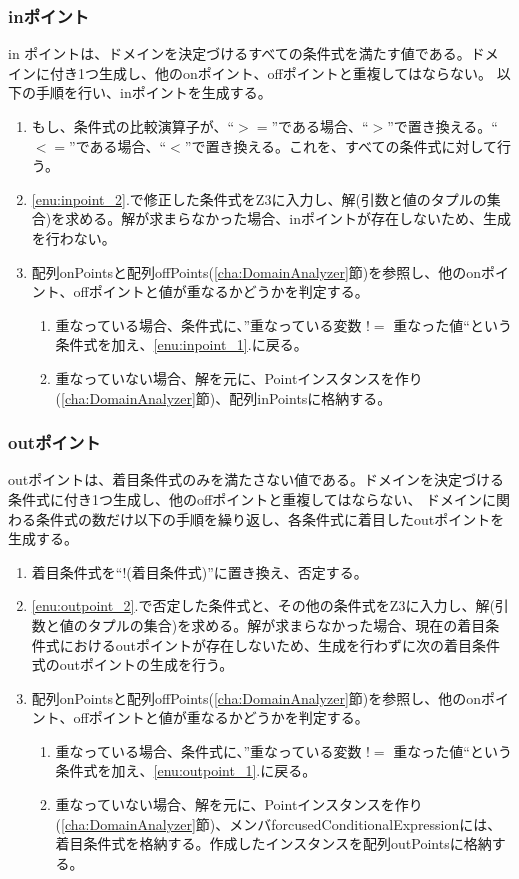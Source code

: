 \documentclass[uplatex, report, a4j, 10pt]{jsbook}
\begin{document}
\subsubsection{inポイント}
in ポイントは、ドメインを決定づけるすべての条件式を満たす値である。ドメインに付き1つ生成し、他のonポイント、offポイントと重複してはならない。
以下の手順を行い、inポイントを生成する。
\begin{enumerate}
  \item\label{enu:inpoint_2} もし、条件式の比較演算子が、“$>=$”である場合、“$>$”で置き換える。“$<=$”である場合、“$<$”で置き換える。これを、すべての条件式に対して行う。
  \item\label{enu:inpoint_1} \ref{enu:inpoint_2}.で修正した条件式をZ3に入力し、解(引数と値のタプルの集合)を求める。解が求まらなかった場合、inポイントが存在しないため、生成を行わない。
  \item 配列onPointsと配列offPoints(\ref{cha:DomainAnalyzer}節)を参照し、他のonポイント、offポイントと値が重なるかどうかを判定する。
        \begin{enumerate}
          \item 重なっている場合、条件式に、”重なっている変数 $!=$ 重なった値“という条件式を加え、\ref{enu:inpoint_1}.に戻る。
          \item 重なっていない場合、解を元に、Pointインスタンスを作り(\ref{cha:DomainAnalyzer}節)、配列inPointsに格納する。
        \end{enumerate}
\end{enumerate}

\subsubsection{outポイント}
outポイントは、着目条件式のみを満たさない値である。ドメインを決定づける条件式に付き1つ生成し、他のoffポイントと重複してはならない、
ドメインに関わる条件式の数だけ以下の手順を繰り返し、各条件式に着目したoutポイントを生成する。
\begin{enumerate}
  \item\label{enu:outpoint_2} 着目条件式を“$!$(着目条件式)”に置き換え、否定する。
  \item\label{enu:outpoint_1} \ref{enu:outpoint_2}.で否定した条件式と、その他の条件式をZ3に入力し、解(引数と値のタプルの集合)を求める。解が求まらなかった場合、現在の着目条件式におけるoutポイントが存在しないため、生成を行わずに次の着目条件式のoutポイントの生成を行う。
  \item 配列onPointsと配列offPoints(\ref{cha:DomainAnalyzer}節)を参照し、他のonポイント、offポイントと値が重なるかどうかを判定する。
        \begin{enumerate}
          \item 重なっている場合、条件式に、”重なっている変数 $!=$ 重なった値“という条件式を加え、\ref{enu:outpoint_1}.に戻る。
          \item 重なっていない場合、解を元に、Pointインスタンスを作り(\ref{cha:DomainAnalyzer}節)、メンバforcusedConditionalExpressionには、着目条件式を格納する。作成したインスタンスを配列outPointsに格納する。
        \end{enumerate}
\end{enumerate}
\end{document}

